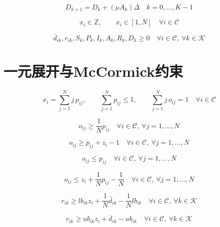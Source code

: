 \documentclass{article}
\begin{document}
\begin{equation}
D_{k+1} = D_k + (\mu A_k)\Delta
\quad k=0,\dots,K-1
\tag{28l}
\end{equation}

\begin{equation}
x_i \in \mathbb Z,\qquad x_i \in [1,N]
\quad \forall i \in \mathcal C
\tag{28m}
\end{equation}

\begin{equation}
\bar d_{ik},r_{ik},S_k,P_k,I_k,A_k,R_k,D_k \ge 0
\quad \forall i \in \mathcal C,\ \forall k \in \mathcal K
\tag{28n}
\end{equation}

\section*{一元展开与McCormick约束}
\begin{equation}
x_i = \sum_{j=1}^{N} j\,p_{ij},\qquad
\sum_{j=1}^{N} p_{ij} \le 1,\qquad
\sum_{j=1}^{N} j\,o_{ij} = 1
\quad \forall i \in \mathcal C
\tag{29a}
\end{equation}

\begin{equation}
o_{ij} \ge \frac{1}{N}p_{ij}
\quad \forall i \in \mathcal C,\ \forall j=1,\dots,N
\tag{29b}
\end{equation}

\begin{equation}
o_{ij} \ge p_{ij} + z_i - 1
\quad \forall i \in \mathcal C,\ \forall j=1,\dots,N
\tag{29c}
\end{equation}

\begin{equation}
o_{ij} \le p_{ij}
\quad \forall i \in \mathcal C,\ \forall j=1,\dots,N
\tag{29d}
\end{equation}

\begin{equation}
o_{ij} \le z_i + \frac{1}{N}p_{ij} - \frac{1}{N}
\quad \forall i \in \mathcal C,\ \forall j=1,\dots,N
\tag{29e}
\end{equation}

\begin{equation}
r_{ik} \ge lb_{ik} z_i + \frac{1}{N}\bar d_{ik} - \frac{1}{N}lb_{ik}
\quad \forall i \in \mathcal C,\ \forall k \in \mathcal K
\tag{29f}
\end{equation}

\begin{equation}
r_{ik} \ge ub_{ik} z_i + \bar d_{ik} - ub_{ik}
\quad \forall i \in \mathcal C,\ \forall k \in \mathcal K
\tag{29g}
\end{equation}
\end{document}
